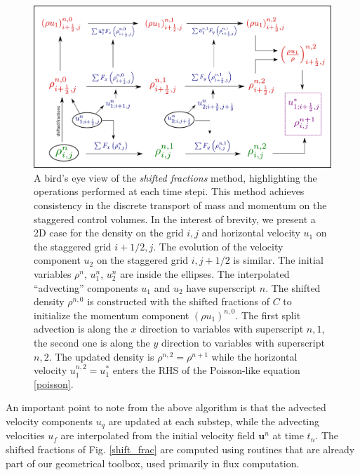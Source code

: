 \begin{figure}
\begin{center}
    \includegraphics[width=\textwidth]{plots/momcons_diagram_daniel.pdf}
\end{center}
\caption{A bird's eye view of the \textit{shifted fractions} method,
highlighting the operations performed at each time stepi. 
This method achieves consistency in the discrete transport 
of mass and momentum on the staggered control volumes.
In the interest of brevity, we present a 2D case for the
density on the grid $i,j$ and horizontal velocity $u_1$ on the staggered grid $i+1/2,j$.
The evolution of the velocity component $u_2$ on the staggered grid $i,j+1/2$ is similar.
The initial variables $\rho^n$, $u_1^n$, $u_2^n$ are inside the ellipses. The interpolated
``advecting'' components $u_1$ and $u_2$ have superscript $n$. The shifted density $\rho^{n,0}$
is constructed with the shifted fractions of $C$ to initialize the momentum component
$(\rho u_1)^{n,0}$. The first split advection is along the $x$ direction  to 
variables with superscript $n,1$, the second one is along the $y$ direction to
variables with superscript $n,2$. The updated density is $\rho^{n,2}=\rho^{n+1}$
while the horizontal velocity $u_1^{n,2}=u_1^{*}$ enters the RHS of the Poisson-like
equation \ref{poisson}. }
\label{momcons_daniel}
\end{figure}


An important point to note from the above algorithm is that 
the advected velocity components $u_q$ are updated at each substep,
while the advecting velocities $u_f$ are interpolated from the initial
velocity field $\boldsymbol{u}^n$ at time $t_n$. 
The shifted fractions of Fig. \ref{shift_frac}
are computed using routines that are already part of our
geometrical toolbox, used primarily in flux computation. 


